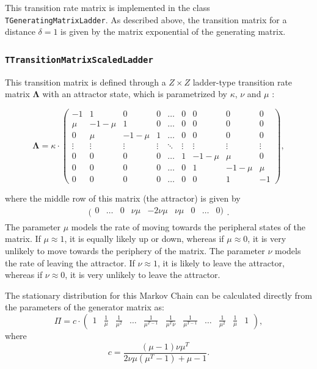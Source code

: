 \documentclass[a4paper,11pt]{article}
\def\bLambda{\boldsymbol{\Lambda}}
\newcommand{\class}[1]{\texttt{#1}}
\begin{document}
This transition rate matrix is implemented in the class \class{TGeneratingMatrixLadder}. As described above, the transition matrix for a distance $\delta = 1$ is given by the matrix exponential of the generating matrix.

\subsubsection{\class{TTransitionMatrixScaledLadder}}\label{section:TTransitionMatrixScaledLadder}
This transition matrix is defined through a $Z \times Z$ ladder-type transition rate matrix $\bLambda$ with an attractor state, which is parametrized by $\kappa$, $\nu$ and $\mu$ \citep{Galimberti2020}:

\begin{equation*}
    \bLambda = \kappa \cdot \left(\begin{array}{ccccccccc}
    -1 & 1 & 0 & 0 & \dots & 0 & 0 & 0 & 0\\
    \mu & -1-\mu & 1 & 0 & \dots & 0 & 0 & 0 & 0\\
     0  & \mu & -1-\mu & 1 & \dots & 0 & 0 & 0 & 0\\
    \vdots & \vdots & \vdots & \vdots & \ddots & \vdots & \vdots & \vdots & \vdots\\
    0 & 0 & 0 & 0 & \dots & 1 & -1-\mu & \mu & 0\\
    0 & 0 & 0 & 0 & \dots & 0 & 1 & -1-\mu & \mu\\
    0 & 0 & 0 & 0 & \dots & 0 & 0 & 1 & -1
    \end{array}\right),
\end{equation*}

where the middle row of this matrix (the attractor) is given by
\begin{equation*}
    (\begin{array}{ccccccccc}
     0  & \ldots & 0 & \nu\mu & -2 \nu\mu & \nu\mu & 0 & \ldots & 0)\\
\end{array}.
\end{equation*}
The parameter $\mu$ models the rate of moving towards the peripheral states of the matrix. If $\mu \approx 1$, it is equally likely up or down, whereas if $\mu \approx 0$, it is very unlikely to move towards the periphery of the matrix. The parameter $\nu$ models the rate of leaving the attractor. If $\nu \approx 1$, it is likely to leave the attractor, whereas if $\nu \approx 0$, it is very unlikely to leave the attractor.

The stationary distribution for this Markov Chain can be calculated directly from the parameters of the generator matrix as:
\begin{equation*}
  \Pi = c \cdot \left(\begin{array}{cccccccccccc}
  1  & \frac{1}{\mu} & \frac{1}{\mu^2} & \ldots & \frac{1}{\mu^{T-1}} & \frac{1}{\mu^T\nu} & \frac{1}{\mu^{T-1}} & \ldots & \frac{1}{\mu^2} & \frac{1}{\mu} & 1
\end{array}\right),
\end{equation*}
where
\begin{equation*}
  c = \frac{(\mu-1)\nu\mu^{T}}{2\nu\mu(\mu^{T}-1)+\mu-1}.
\end{equation*}
\end{document}
